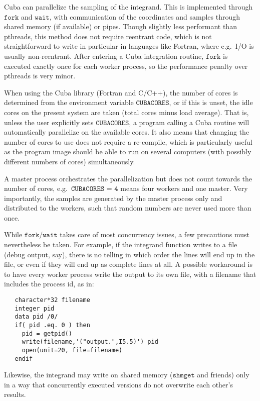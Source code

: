 \documentclass[12pt]{article}
\newcommand\eg{e.g.\ }
\newcommand\Code[1]{\ensuremath{\texttt{#1}}}
\begin{document}
Cuba can parallelize the sampling of the integrand.  This is implemented 
through \Code{fork} and \Code{wait}, with communication of the 
coordinates and samples through shared memory (if available) or pipes. 
Though slightly less performant than pthreads, this method does not 
require reentrant code, which is not straightforward to write in 
particular in languages like Fortran, where \eg I/O is usually 
non-reentrant.  After entering a Cuba integration routine, \Code{fork} 
is executed exactly once for each worker process, so the performance 
penalty over pthreads is very minor.

When using the Cuba library (Fortran and C/C++), the number of cores is 
determined from the environment variable \Code{CUBACORES}, or if this is 
unset, the idle cores on the present system are taken (total cores minus 
load average).  That is, unless the user explicitly sets 
\Code{CUBACORES}, a program calling a Cuba routine will automatically 
parallelize on the available cores.  It also means that changing the 
number of cores to use does not require a re-compile, which is 
particularly useful as the program image should be able to run on 
several computers (with possibly different numbers of cores) 
simultaneously.

A master process orchestrates the parallelization but does not count 
towards the number of cores, \eg \Code{CUBACORES = 4} means four workers 
and one master.  Very importantly, the samples are generated by the 
master process only and distributed to the workers, such that random 
numbers are never used more than once.

While \Code{fork}/\Code{wait} takes care of most concurrency issues, a 
few precautions must nevertheless be taken.  For example, if the 
integrand function writes to a file (debug output, say), there is no 
telling in which order the lines will end up in the file, or even if 
they will end up as complete lines at all.  A possible workaround is to 
have every worker process write the output to its own file, with a 
filename that includes the process id, as in:
\begin{verbatim}
   character*32 filename
   integer pid
   data pid /0/
   if( pid .eq. 0 ) then  
     pid = getpid()
     write(filename,'("output.",I5.5)') pid
     open(unit=20, file=filename)
   endif
\end{verbatim}
Likewise, the integrand may write on shared memory (\Code{shmget} and 
friends) only in a way that concurrently executed versions do not
overwrite each other's results.
\end{document}
